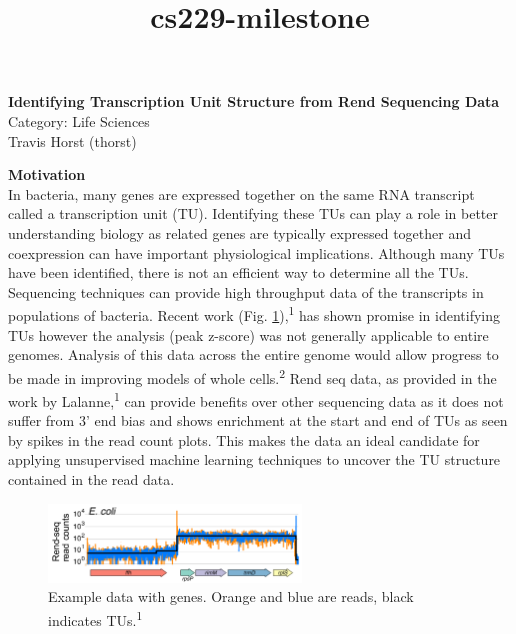 \documentclass[11pt]{article}
\begin{document}
\title{cs229-milestone}

\thispagestyle{empty}

\begin{center}
{\large \bf Identifying Transcription Unit Structure from Rend Sequencing Data} \\
Category: Life Sciences \\
Travis Horst (thorst)
\end{center}

\textbf{Motivation} \vspace{4pt} \\
In bacteria, many genes are expressed together on the same RNA transcript called a transcription unit (TU).  Identifying these TUs can play a role in better understanding biology as related genes are typically expressed together and coexpression can have important physiological implications.  Although many TUs have been identified, there is not an efficient way to determine all the TUs.  Sequencing techniques can provide high throughput data of the transcripts in populations of bacteria.  Recent work (Fig. \ref{fig:lalanne_reads}),\textsuperscript{1} has shown promise in identifying TUs however the analysis (peak z-score) was not generally applicable to entire genomes.  Analysis of this data across the entire genome would allow progress to be made in improving models of whole cells.\textsuperscript{2}  Rend seq data, as provided in the work by Lalanne,\textsuperscript{1} can provide benefits over other sequencing data as it does not suffer from 3' end bias and shows enrichment at the start and end of TUs as seen by spikes in the read count plots.  This makes the data an ideal candidate for applying unsupervised machine learning techniques to uncover the TU structure contained in the read data.

\begin{figure}[H]
    \centering
    \includegraphics[width=0.6\textwidth]{lalanne_reads.png}
    \caption{Example data with genes. Orange and blue are reads, black indicates TUs.\textsuperscript{1}}
    \label{fig:lalanne_reads}
\end{figure}
\end{document}
